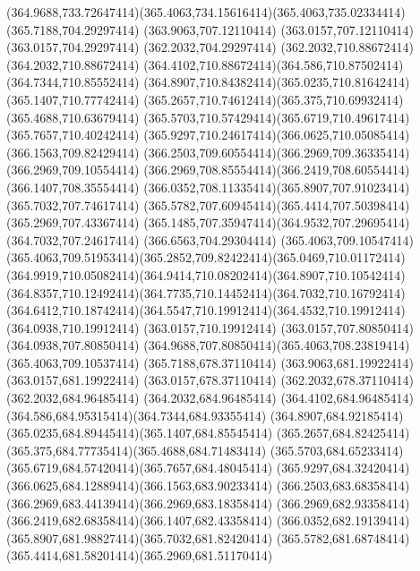 {{	\curveto(364.9688,733.72647414)(365.4063,734.15616414)(365.4063,735.02334414)
	\closepath
	\moveto(365.7188,704.29297414)
	\lineto(363.9063,707.12110414)
	\lineto(363.0157,707.12110414)
	\lineto(363.0157,704.29297414)
	\lineto(362.2032,704.29297414)
	\lineto(362.2032,710.88672414)
	\lineto(364.2032,710.88672414)
	\curveto(364.4102,710.88672414)(364.586,710.87502414)(364.7344,710.85552414)
	\curveto(364.8907,710.84382414)(365.0235,710.81642414)(365.1407,710.77742414)
	\curveto(365.2657,710.74612414)(365.375,710.69932414)(365.4688,710.63679414)
	\curveto(365.5703,710.57429414)(365.6719,710.49617414)(365.7657,710.40242414)
	\curveto(365.9297,710.24617414)(366.0625,710.05085414)(366.1563,709.82429414)
	\curveto(366.2503,709.60554414)(366.2969,709.36335414)(366.2969,709.10554414)
	\curveto(366.2969,708.85554414)(366.2419,708.60554414)(366.1407,708.35554414)
	\curveto(366.0352,708.11335414)(365.8907,707.91023414)(365.7032,707.74617414)
	\curveto(365.5782,707.60945414)(365.4414,707.50398414)(365.2969,707.43367414)
	\curveto(365.1485,707.35947414)(364.9532,707.29695414)(364.7032,707.24617414)
	\lineto(366.6563,704.29304414)
	\closepath
	\moveto(365.4063,709.10547414)
	\curveto(365.4063,709.51953414)(365.2852,709.82422414)(365.0469,710.01172414)
	\curveto(364.9919,710.05082414)(364.9414,710.08202414)(364.8907,710.10542414)
	\curveto(364.8357,710.12492414)(364.7735,710.14452414)(364.7032,710.16792414)
	\curveto(364.6412,710.18742414)(364.5547,710.19912414)(364.4532,710.19912414)
	\lineto(364.0938,710.19912414)
	\lineto(363.0157,710.19912414)
	\lineto(363.0157,707.80850414)
	\lineto(364.0938,707.80850414)
	\curveto(364.9688,707.80850414)(365.4063,708.23819414)(365.4063,709.10537414)
	\closepath
	\moveto(365.7188,678.37110414)
	\lineto(363.9063,681.19922414)
	\lineto(363.0157,681.19922414)
	\lineto(363.0157,678.37110414)
	\lineto(362.2032,678.37110414)
	\lineto(362.2032,684.96485414)
	\lineto(364.2032,684.96485414)
	\curveto(364.4102,684.96485414)(364.586,684.95315414)(364.7344,684.93355414)
	\curveto(364.8907,684.92185414)(365.0235,684.89445414)(365.1407,684.85545414)
	\curveto(365.2657,684.82425414)(365.375,684.77735414)(365.4688,684.71483414)
	\curveto(365.5703,684.65233414)(365.6719,684.57420414)(365.7657,684.48045414)
	\curveto(365.9297,684.32420414)(366.0625,684.12889414)(366.1563,683.90233414)
	\curveto(366.2503,683.68358414)(366.2969,683.44139414)(366.2969,683.18358414)
	\curveto(366.2969,682.93358414)(366.2419,682.68358414)(366.1407,682.43358414)
	\curveto(366.0352,682.19139414)(365.8907,681.98827414)(365.7032,681.82420414)
	\curveto(365.5782,681.68748414)(365.4414,681.58201414)(365.2969,681.51170414)
}}
